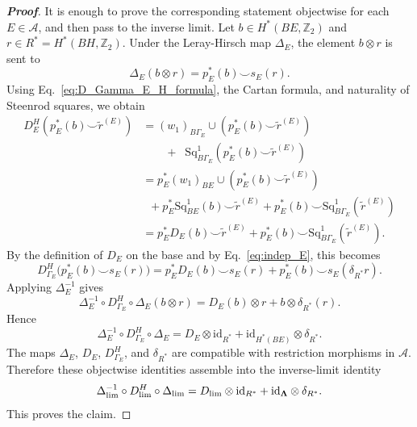 \documentclass[aps,prx,reprint,superscriptaddress,twocolumn,amsmath,amssymb,amsfonts, nofootinbib]{revtex4-2}
\newcommand{\Z}{\mathbb{Z}}
\theoremstyle{apsstyle}
\begin{document}
\begin{proof}[\textnormal{\textbf{Proof}}]
It is enough to prove the corresponding statement objectwise for each $E\in\mathcal A$, and then pass to the inverse limit. Let $b\in H^{*}(BE,\Z_{2})$ and $r\in R^{*}=H^{*}(BH,\Z_{2})$. Under the Leray-Hirsch map $\Delta_E$, the element $b\otimes r$ is sent to
\begin{equation}
\Delta_E(b\otimes r)=p_E^{*}(b)\smile s_E(r).
\end{equation}
Using Eq.~\eqref{eq:D_Gamma_E_H_formula}, the Cartan formula, and naturality of Steenrod squares, we obtain
\begin{align*}
    D_{E}^{H}(p_{E}^{*}(b)\smile \widetilde{r}^{(E)}) &= (w_{1})_{B\Gamma_E} \cup (p_{E}^{*}(b)\smile \widetilde{r}^{(E)}) \\
    &\qquad +\;\; \mathrm{Sq}^{1}_{B\Gamma_{E}}(p_{E}^{*}(b)\smile \widetilde{r}^{(E)})\\
    &= p_{E}^{*} (w_{1})_{BE} \cup (p_{E}^{*}(b)\smile \widetilde{r}^{(E)}) \\
    &\;\;+ p_{E}^{*}\mathrm{Sq}^{1}_{BE}(b)\smile \widetilde{r}^{(E)} + p_{E}^{*}(b)\smile \mathrm{Sq}^{1}_{B\Gamma_{E}}(\widetilde{r}^{(E)})\\
    &= p_{E}^{*}D_{E}(b)\smile \widetilde{r}^{(E)} + p_{E}^{*}(b)\smile \mathrm{Sq}^{1}_{B\Gamma_{E}}(\widetilde{r}^{(E)}).
\end{align*}
By the definition of $D_E$ on the base and by Eq.~\eqref{eq:indep_E}, this becomes
\begin{equation}
D_{\Gamma_E}^{H}\bigl(p_E^{*}(b)\smile s_E(r)\bigr)
= p_E^{*}D_E(b)\smile s_E(r) + p_E^{*}(b)\smile s_E(\delta_{R^{*}}r).
\end{equation}
Applying $\Delta_E^{-1}$ gives
\begin{equation}
\Delta_E^{-1}\circ D_{\Gamma_E}^{H}\circ \Delta_E(b\otimes r)
= D_E(b)\otimes r + b\otimes \delta_{R^{*}}(r).
\end{equation}
Hence
\begin{equation}
\Delta_E^{-1}\circ D_{\Gamma_E}^{H}\circ \Delta_E
= D_E\otimes \mathrm{id}_{R^{*}} + \mathrm{id}_{H^{*}(BE)}\otimes \delta_{R^{*}}.
\end{equation}
The maps $\Delta_E$, $D_E$, $D_{\Gamma_E}^{H}$, and $\delta_{R^{*}}$ are compatible with restriction morphisms in $\mathcal A$. Therefore these objectwise identities assemble into the inverse-limit identity
\begin{equation}
\Delta_{\lim}^{-1}\circ D_{\lim}^{H}\circ \Delta_{\lim}
= D_{\lim}\otimes \mathrm{id}_{R^{*}} + \mathrm{id}_{{\bf \Lambda}}\otimes \delta_{R^{*}}.
\end{equation}
This proves the claim.
\end{proof}
\end{document}
